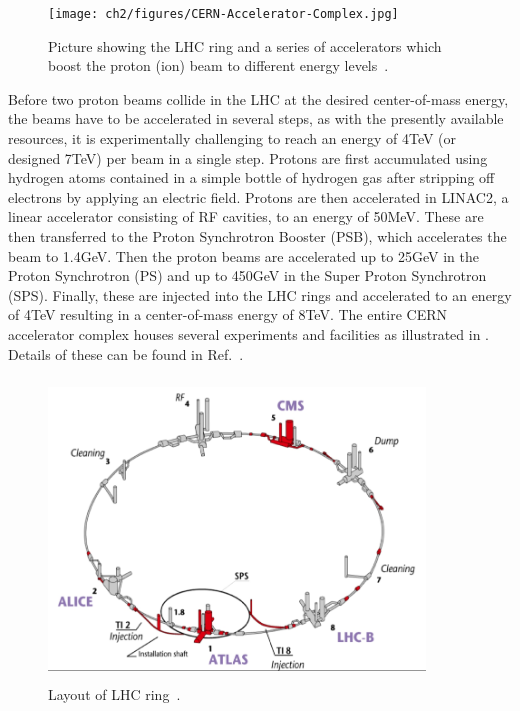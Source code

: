 \begin{figure}[h!]
\centering
\texttt{[image: ch2/figures/CERN-Accelerator-Complex.jpg]}
\caption{Picture showing the LHC ring and a series of accelerators which boost the proton (ion) beam to different energy levels~\cite{Web:CERN}.}
\label{fig:CERNAccComplex}
\end{figure}
Before two proton beams collide in the LHC at the desired center-of-mass energy, the beams have to be accelerated in several steps, as with the
presently available resources, it is experimentally challenging to reach an energy of 4\unit{TeV} (or designed 7\unit{TeV}) per beam in a single step.
Protons are first accumulated using hydrogen atoms contained in a simple bottle of hydrogen gas after stripping off electrons by applying an
electric field. Protons are then accelerated in \gls{LINAC2}, a linear accelerator consisting of RF cavities, to an energy of 50\unit{MeV}. These are 
then transferred to the Proton Synchrotron Booster (\gls{PSB}), which accelerates the beam to 1.4\unit{GeV}. Then the proton beams
are accelerated up to 25\unit{GeV} in the Proton Synchrotron (\gls{PS}) and up to 450\unit{GeV} in the Super Proton Synchrotron (\gls{SPS}). 
Finally, these are injected into the LHC rings and accelerated to an energy of 4\unit{TeV} resulting in a center-of-mass energy 
of 8\unit{TeV}. The entire CERN accelerator complex houses several experiments and facilities as illustrated in \fig{\ref{fig:CERNAccComplex}}.
Details of these can be found in Ref.~\cite{Web:CERN}. 

\begin{figure}[h!]
\centering
\includegraphics[width=10cm,height=8cm]{ch2/figures/lhcLayout_v2.png}
\caption{Layout of LHC ring~\cite{Web:CERNcds}.}
\label{fig:lhcLayout}
\end{figure}

